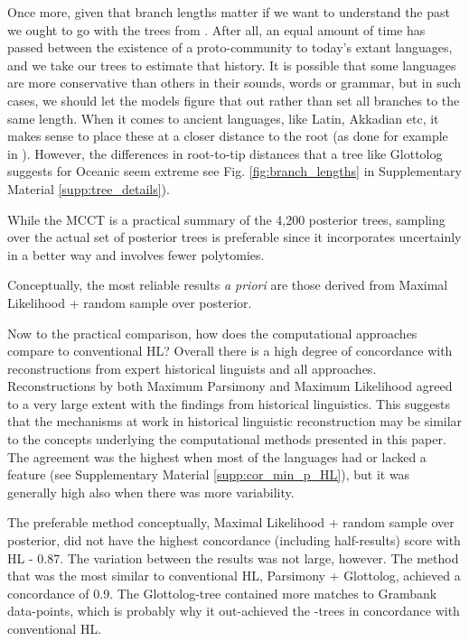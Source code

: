 \documentclass[12pt,letterpaper]{article}
\begin{document}
Once more, given that branch lengths matter if we want to understand the past we ought to go with the trees from \cite{grayetal_2009}. After all, an equal amount of time has passed between the existence of a proto-community to today's extant languages, and we take our trees to estimate that history. It is possible that some languages are more conservative than others in their sounds, words or grammar, but in such cases, we should let the models figure that out rather than set all branches to the same length. When it comes to ancient languages, like Latin, Akkadian etc, it makes sense to place these at a closer distance to the root (as done for example in \citet{carling2021reconstructing}). However, the differences in root-to-tip distances that a tree like Glottolog suggests for Oceanic seem extreme see Fig. \ref{fig:branch_lengths} in Supplementary Material \ref{supp:tree_details}). 

While the MCCT is a practical summary of the 4,200 posterior trees, sampling over the actual set of posterior trees is preferable since it incorporates uncertainly in a better way and involves fewer polytomies.

Conceptually, the most reliable results \emph{a priori} are those derived from Maximal Likelihood + random sample over posterior.

Now to the practical comparison, how does the computational approaches compare to conventional HL? Overall there is a high degree of concordance with reconstructions from expert historical linguists and all approaches. Reconstructions by both Maximum Parsimony and Maximum Likelihood agreed to a very large extent with the findings from historical linguistics. This suggests that the mechanisms at work in historical linguistic reconstruction may be similar to the concepts underlying the computational methods presented in this paper. The agreement was the highest when most of the languages had or lacked a feature (see Supplementary Material \ref{supp:cor_min_p_HL}), but it was generally high also when there was more variability.

The preferable method conceptually, Maximal Likelihood + random sample over \citet{grayetal_2009} posterior, did not have the highest concordance (including half-results) score with HL - 0.87. The variation between the results was not large, however. The method that was the most similar to conventional HL, Parsimony + Glottolog, achieved a concordance of 0.9. The Glottolog-tree contained more matches to Grambank data-points, which is probably why it out-achieved the \cite{grayetal_2009}-trees in concordance with conventional HL.
\end{document}
